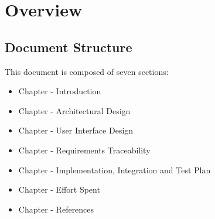 \section{Overview}
\subsection{Document Structure}
\label{sec:doc_structure}%
This document is composed of seven sections:
\begin{itemize}
    \item{}  Chapter - Introduction
    \item{}  Chapter - Architectural Design
    \item{}  Chapter - User Interface Design
    \item{}  Chapter - Requirements Traceability
    \item{}  Chapter - Implementation, Integration and Test Plan
    \item{}  Chapter - Effort Spent
    \item{}  Chapter - References
\end{itemize}
